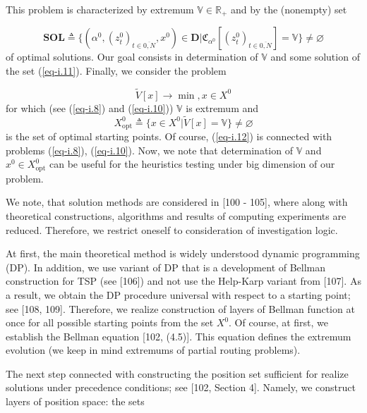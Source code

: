 \documentclass{article}
\begin{document}
This problem is characterized by extremum
$\mathbb V \in \mathbb R_+$
and by the (nonempty) set

\begin{equation}
  \label{eq-i.11}
  \mathbf{SOL}
  \triangleq
  \{
    (\alpha^0, (z_t^0)_{t \in \overline{0,N}}, x^0) \in \mathbf D
  |
    \mathfrak C_{\alpha^0}[(z_t^0)_{t \in \overline{0,N}}] = \mathbb V
  \}
  \neq \varnothing
\end{equation}
of optimal solutions.
Our goal consists in determination of
$\mathbb V$
and some solution of the set (\ref{eq-i.11}).
Finally, we consider the problem

\begin{equation}
  \label{eq-i.12}
  \tilde{V}[x] \to \min,
  x \in X^0
\end{equation}
for which
(see (\ref{eq-i.8}) and (\ref{eq-i.10}))
$\mathbb V$
is extremum and
\begin{equation*}
  X^0_{\mathrm{opt}}
  \triangleq
  \{
    x \in X^0
  |
    \tilde{V}[x] = \mathbb V
  \}
  \neq \varnothing
\end{equation*}
is the set of optimal starting points.
Of course,
(\ref{eq-i.12})
is connected with problems
(\ref{eq-i.8}), (\ref{eq-i.10}).
Now, we note that determination of
$\mathbb V$
and
$x^0 \in X^0_{\mathrm{opt}}$
can be useful for the heuristics testing
under big dimension of our problem.

We note, that solution methods are considered in
[100 - 105],       %
where along with theoretical constructions,
algorithms and results of computing experiments are reduced.
Therefore,
we restrict oneself to consideration of investigation logic.

At first,
the main theoretical method is widely understood dynamic programming
(DP).
In addition,
we use variant of DP that is a development of Bellman
construction for TSP
(see [106])   %
and not use the Help-Karp variant from
[107].        %
As a result,
we obtain the DP procedure universal with respect to
a starting point; see
[108, 109].   %
Therefore,
we realize construction of layers of Bellman function at once
for all possible starting points from the set
$X^0$.
Of course,
at first,
we establish the Bellman equation
[102, (4.5)].  %
This equation defines the extremum evolution
(we keep in mind extremums of partial routing problems).

The next step connected with constructing the position set
sufficient for realize solutions
under precedence conditions;
see
[102, Section 4].  %
Namely,
we construct layers of position space:
the sets
\end{document}
